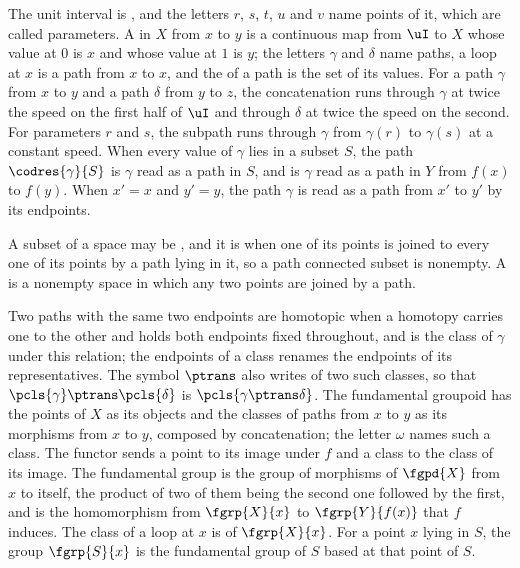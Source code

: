 The unit interval is , and the letters $r$, $s$,
$t$, $u$ and $v$ name points of it, which are called parameters.  A
 in $X$ from $x$ to $y$ is a continuous map from $\uI$ to
$X$ whose value at $0$ is $x$ and whose value at $1$ is $y$; the letters
$\gamma$ and $\delta$ name paths, a loop at $x$ is a path from $x$ to $x$, and
the  of a path is the set of its values.  For a path
$\gamma$ from $x$ to $y$ and a path $\delta$ from $y$ to $z$, the concatenation
 runs through $\gamma$ at twice
the speed on the first half of $\uI$ and through $\delta$ at twice the speed on
the second.  For parameters $r$ and $s$, the subpath
 runs through $\gamma$ from
$\gamma(r)$ to $\gamma(s)$ at a constant speed.  When every value of $\gamma$
lies in a subset $S$, the path $\codres{\gamma}{S}$ is $\gamma$ read as a path
in $S$, and  is $\gamma$ read as a path in
$Y$ from $f(x)$ to $f(y)$.  When $x' = x$ and $y' = y$, the path $\gamma$ is
read as a path from $x'$ to $y'$ by  its
endpoints.

A subset of a space may be , and it is
 when one of its points is joined to
every one of its points by a path lying in it, so a path connected subset is
nonempty.  A  is a nonempty
space in which any two points are joined by a path.

Two paths with the same two endpoints are homotopic when a homotopy carries one
to the other and holds both endpoints fixed throughout, and
 is the class of $\gamma$
under this relation;  the
endpoints of a class renames the endpoints of its representatives.  The symbol
$\ptrans$ also writes 
of two such classes, so that $\pcls{\gamma} \ptrans \pcls{\delta}$ is
$\pcls{\gamma \ptrans \delta}$.  The fundamental groupoid
 has the points of $X$ as its objects
and the classes of paths from $x$ to $y$ as its morphisms from $x$ to $y$,
composed by concatenation; the letter $\omega$ names such a class.  The functor
 sends a point to its image under
$f$ and a class to the class of its image.  The fundamental group
 is the group of morphisms of
$\fgpd{X}$ from $x$ to itself, the product of two of them being the second one
followed by the first, and  is the
homomorphism from $\fgrp{X}{x}$ to $\fgrp{Y}{f(x)}$ that $f$ induces.  The class
of a loop at $x$ is  of
$\fgrp{X}{x}$.  For a point $x$ lying in $S$, the group $\fgrp{S}{x}$ is the
fundamental group of $S$ based at that point of $S$.

